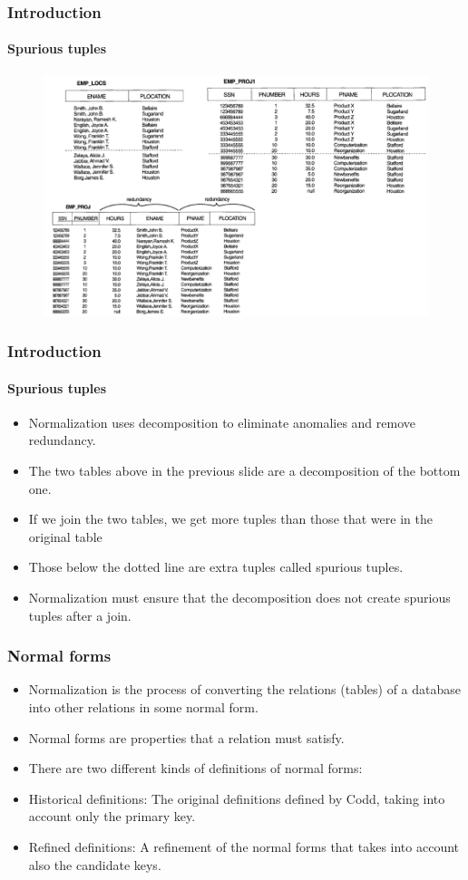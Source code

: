 \documentclass{beamer}
\begin{document}
\begin{frame}
	\frametitle{Introduction}
	\framesubtitle{Spurious tuples}
	
	\begin{figure}
		\includegraphics[scale=0.4]{img/normalization/norm3}
	\end{figure}
\end{frame}

\begin{frame}
	\frametitle{Introduction}
	\framesubtitle{Spurious tuples}
	
	\begin{itemize}
		\item Normalization uses decomposition to eliminate anomalies and remove redundancy.
		\item The two tables above in the previous slide are a decomposition of the bottom one.
		\item If we join the two tables, we get more tuples than those that were in the original table
		\item Those below the dotted line are extra tuples called spurious tuples.
		\item Normalization must ensure that the decomposition does not create spurious tuples after a join.
	\end{itemize}
\end{frame}

\begin{frame}
	\frametitle{Normal forms}
	\begin{itemize}
		\item Normalization is the process of converting the relations (tables) of a database into other relations in some normal form.
		\item Normal forms are properties that a relation must satisfy.
		\item There are two different kinds of definitions of normal forms:
		\item Historical definitions: The original definitions defined by Codd, taking into account only the primary key.
		\item Refined definitions: A refinement of the normal forms that takes into account also the candidate keys.		
	\end{itemize}
\end{frame}
\end{document}
